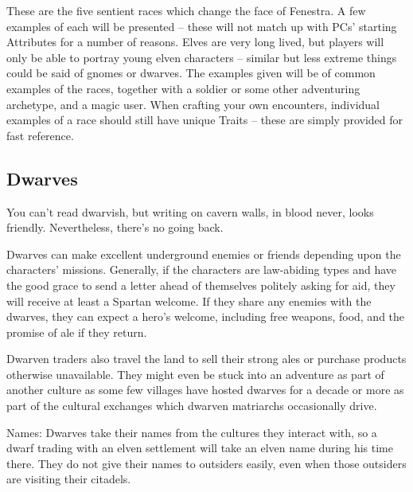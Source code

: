 \begin{multicols}{2}

\noindent
These are the five sentient races which change the face of Fenestra.
A few examples of each will be presented -- these will not match up with PCs' starting Attributes for a number of reasons.
Elves are very long lived, but players will only be able to portray young elven characters -- similar but less extreme things could be said of gnomes or dwarves.
The examples given will be of common examples of the races, together with a soldier or some other adventuring archetype, and a magic user.
When crafting your own encounters, individual examples of a race should still have unique Traits -- these are simply provided for fast reference.

\subsection{Dwarves}

\begin{boxtext}

  You can't read dwarvish, but writing on cavern walls, in blood never, looks friendly.
  Nevertheless, there's no going back.

\end{boxtext}

Dwarves can make excellent underground enemies or friends depending upon the characters' missions.
Generally, if the characters are law-abiding types and have the good grace to send a letter ahead of themselves politely asking for aid, they will receive at least a Spartan welcome.
If they share any enemies with the dwarves, they can expect a hero's welcome, including free weapons, food, and the promise of ale if they return.

Dwarven traders also travel the land to sell their strong ales or purchase products otherwise unavailable.
They might even be stuck into an adventure as part of another culture as some few villages have hosted dwarves for a decade or more as part of the cultural exchanges which dwarven matriarchs occasionally drive.

Names: Dwarves take their names from the cultures they interact with, so a dwarf trading with an elven settlement will take an elven name during his time there.
They do not give their names to outsiders easily, even when those outsiders are visiting their citadels.

\begin{boxtext}


\end{boxtext}
\end{multicols}
